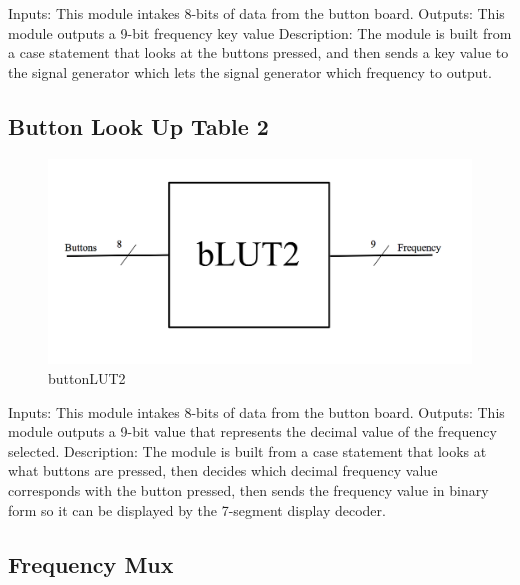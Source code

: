 \documentclass[a4paper]{article}
\begin{document}
Inputs: This module intakes 8-bits of data from the button board.
\newline\newline
Outputs: This module outputs a 9-bit frequency key value
\newline\newline
Description: The module is built from a case statement that looks at the buttons pressed, and then sends a key value to the signal generator which lets the signal generator which frequency to output.


\subsection{Button Look Up Table 2}

\begin{figure}[h]
    \includegraphics[width=6 in]{./Images/jackPictures/blut2.png}
    \caption{buttonLUT2}
    \label{fig:9}
\end{figure}

Inputs: This module intakes 8-bits of data from the button board.
\newline\newline
Outputs: This module outputs a 9-bit value that represents the decimal value of the frequency selected.
\newline\newline
Description: The module is built from a case statement that looks at what buttons are pressed, then decides which decimal frequency value corresponds with the button pressed, then sends the frequency value in binary form so it can be displayed by the 7-segment display decoder.


\subsection{Frequency Mux}
\end{document}
